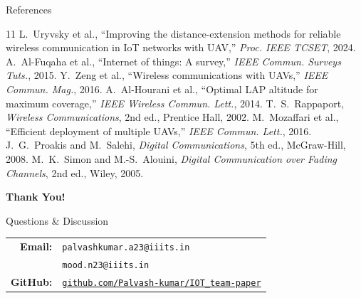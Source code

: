 \documentclass[aspectratio=169, 11pt]{beamer}
\begin{document}
\begin{frame}{References}
\footnotesize
\begin{thebibliography}{11}
 L.~Uryvsky et al., ``Improving the distance-extension methods for reliable wireless communication in IoT networks with UAV,'' \textit{Proc. IEEE TCSET}, 2024.
 A.~Al-Fuqaha et al., ``Internet of things: A survey,'' \textit{IEEE Commun. Surveys Tuts.}, 2015.
 Y.~Zeng et al., ``Wireless communications with UAVs,'' \textit{IEEE Commun. Mag.}, 2016.
 A.~Al-Hourani et al., ``Optimal LAP altitude for maximum coverage,'' \textit{IEEE Wireless Commun. Lett.}, 2014.
 T.~S.~Rappaport, \textit{Wireless Communications}, 2nd ed., Prentice Hall, 2002.
 M.~Mozaffari et al., ``Efficient deployment of multiple UAVs,'' \textit{IEEE Commun. Lett.}, 2016.
 J.~G.~Proakis and M.~Salehi, \textit{Digital Communications}, 5th ed., McGraw-Hill, 2008.
 M.~K.~Simon and M.-S.~Alouini, \textit{Digital Communication over Fading Channels}, 2nd ed., Wiley, 2005.
\end{thebibliography}
\end{frame}

{
\begin{frame}[plain]
\vfill
\centering
{\Huge\textcolor{iiitblue}{\textbf{Thank You!}}}

\vspace{0.8cm}
{\large Questions \& Discussion}

\vspace{1cm}
\begin{tabular}{rl}
\textcolor{iiitblue}{\textbf{Email:}} & \texttt{palvashkumar.a23@iiits.in} \\[4pt]
                                       & \texttt{mood.n23@iiits.in} \\[8pt]
\textcolor{iiitblue}{\textbf{GitHub:}} & \href{https://github.com/Palvash-kumar/IOT_team-paper}{\texttt{github.com/Palvash-kumar/IOT\_team-paper}} \\
\end{tabular}
\vfill
\end{frame}
}
\end{document}
